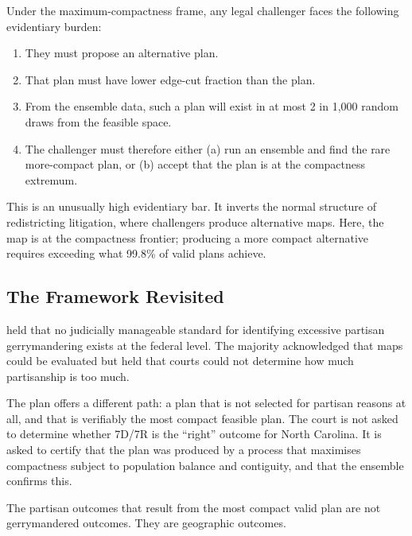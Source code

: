 Under the maximum-compactness frame, any legal challenger faces the following
evidentiary burden:

\begin{enumerate}
  \item They must propose an alternative plan.
  \item That plan must have lower edge-cut fraction than the \ar{} plan.
  \item From the ensemble data, such a plan will exist in at most 2 in 1,000
    random draws from the feasible space.
  \item The challenger must therefore either (a) run an ensemble and find the
    rare more-compact plan, or (b) accept that the \ar{} plan is at the
    compactness extremum.
\end{enumerate}

This is an unusually high evidentiary bar.  It inverts the normal structure
of redistricting litigation, where challengers produce alternative maps.  Here,
the map is at the compactness frontier; producing a more compact alternative
requires exceeding what 99.8\% of valid plans achieve.

\subsection{The \texorpdfstring{\rucho{}}{Rucho} Framework Revisited}

\rucho{} held that no judicially manageable standard for identifying excessive
partisan gerrymandering exists at the federal level.  The majority
acknowledged that maps could be evaluated but held that courts could not
determine how much partisanship is too much.

The \ar{} plan offers a different path: a plan that is not selected for
partisan reasons at all, and that is verifiably the most compact feasible
plan.  The court is not asked to determine whether 7D/7R is the ``right''
outcome for North Carolina.  It is asked to certify that the \ar{} plan was
produced by a process that maximises compactness subject to population balance
and contiguity, and that the ensemble confirms this.

The partisan outcomes that result from the most compact valid plan are not
gerrymandered outcomes.  They are geographic outcomes.
